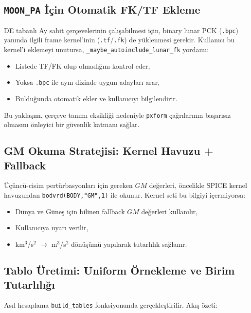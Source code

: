 \subsection*{\texttt{MOON\_PA} İçin Otomatik FK/TF Ekleme}

DE tabanlı Ay sabit çerçevelerinin çalışabilmesi için,
binary lunar PCK (\texttt{.bpc}) yanında ilgili frame kernel’inin
(\texttt{.tf}/\texttt{.fk}) de yüklenmesi gerekir.
Kullanıcı bu kernel’i eklemeyi unutursa,
\texttt{\_maybe\_autoinclude\_lunar\_fk} yordamı:

\begin{itemize}
  \item Listede TF/FK olup olmadığını kontrol eder,
  \item Yoksa \texttt{.bpc} ile aynı dizinde uygun adayları arar,
  \item Bulduğunda otomatik ekler ve kullanıcıyı bilgilendirir.
\end{itemize}

Bu yaklaşım, çerçeve tanımı eksikliği nedeniyle
\texttt{pxform} çağrılarının başarısız olmasını
önleyici bir güvenlik katmanı sağlar.

\subsection*{GM Okuma Stratejisi: Kernel Havuzu + Fallback}

Üçüncü-cisim pertürbasyonları için gereken $GM$ değerleri,
öncelikle SPICE kernel havuzundan
\texttt{bodvrd(BODY,"GM",1)} ile okunur.
Kernel seti bu bilgiyi içermiyorsa:

\begin{itemize}
  \item Dünya ve Güneş için bilinen fallback $GM$ değerleri kullanılır,
  \item Kullanıcıya uyarı verilir,
  \item km$^3$/s$^2$ $\rightarrow$ m$^3$/s$^2$ dönüşümü yapılarak tutarlılık sağlanır.
\end{itemize}

\subsection*{Tablo Üretimi: Uniform Örnekleme ve Birim Tutarlılığı}

Asıl hesaplama \texttt{build\_tables} fonksiyonunda gerçekleştirilir.
Akış özeti:

